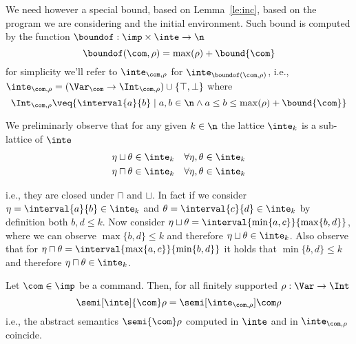We need however a special bound, based on Lemma~\ref{le:inc}, based on
the program we are considering and the initial environment. Such bound
is computed by the function \({\boundof : \imp \times \inte \to \n}\)
\begin{equation*}
  \boundof(\com, \rho) = \max(\rho) + \bound{\com}
\end{equation*}
for simplicity we'll refer to \(\inte_{\com,\rho}\) for
\(\inte_{\boundof(\com,\rho)}\), i.e.,
\({\inte_{\com,\rho} = (\Var_{\com} \to \Int_{\com,\rho}) \cup \{
  \top, \bot \}}\) where
\begin{equation*}
  \Int_{\com,\rho} \veq \{ \interval{a}{b} \mid a, b \in \n \land
  a \leq b \leq \max(\rho) + \bound{\com}\}
\end{equation*}

We preliminarly observe that for any given \(k\in\n\) the lattice
\(\inte_k\) is a sub-lattice of \(\inte\)
\begin{align*}
  \eta \sqcup \theta & \in \inte_k & \forall \eta,\theta \in \inte_k \\
  \eta \sqcap \theta & \in \inte_k & \forall \eta,\theta \in \inte_k
\end{align*}

i.e., they are closed under \(\sqcap\) and \(\sqcup\). In fact if we
consider \({\eta = \interval{a}{b} \in \inte_k}\) and
\({\theta = \interval{c}{d} \in \inte_k}\) by definition both
\(b,d \leq k\). Now consider
\({\eta \sqcup \theta = \interval{\min\{a,c\}}{\max\{b,d\}}}\), where
we can observe \(\max\{b,d\} \leq k\) and therefore
\({\eta \sqcup \theta \in \inte_k}\). Also observe that for
\({\eta \sqcap \theta = \interval{\max\{a,c\}}{\min\{b,d\}}}\) it
holds that \({\min\{b,d\} \leq k}\) and therefore
\({\eta \sqcap \theta \in \inte_k}\).


\begin{lemma}
  Let \(\com\in \imp\) be a command. Then, for all finitely supported
  \(\rho : \Var \to \Int\)
  \begin{equation*}
    \semi[\inte]{\com}\rho = \semi[\inte_{\com,\rho}]{\com}\rho
  \end{equation*}
  i.e., the abstract semantics \(\semi{\com} \rho \)
  computed in \(\inte\) and in \(\inte_{\com,\rho}\) coincide.
\end{lemma}

